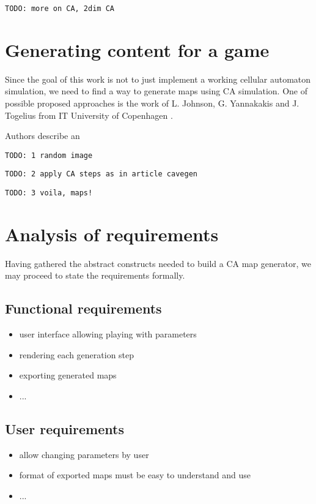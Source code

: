 \documentclass[12pt]{report}
\newcommand{\todo}[1]{}
\renewcommand{\todo}[1]{{\color{red} \par \noindent \footnotesize \texttt{TODO: {#1} }}}
\begin{document}
\todo{more on CA, 2dim CA}


 







\section{Generating content for a game}

Since the goal of this work is not to just implement a working cellular automaton simulation, we need to find a way to generate maps using CA simulation. One of possible proposed approaches is the work of L. Johnson, G. Yannakakis and J. Togelius from IT University of Copenhagen \autocite{johnson2010cellular}. 

Authors describe an 


\todo{1 random image}
\todo{2 apply CA steps as in article cavegen}
\todo{3 voila, maps!}



\section{Analysis of requirements}

Having gathered the abstract constructs needed to build a CA map generator, we may proceed to state the requirements formally.

\subsection{Functional requirements}

\begin{itemize}
	\item user interface allowing playing with parameters
	\item rendering each generation step
	\item exporting generated maps
	\item ...
\end{itemize}

\subsection{User requirements}

\begin{itemize}
	\item allow changing parameters by user
	\item format of exported maps must be easy to understand and use
	\item ...
\end{itemize}
\end{document}

